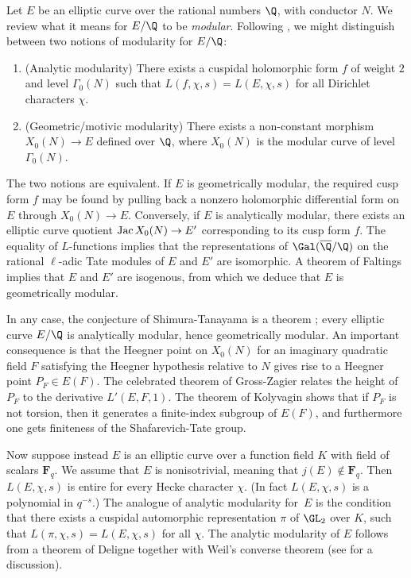\documentclass{article}
\def\F{\mathbf{F}}
\DeclareMathOperator{\Jac}{{\rm Jac}}
\begin{document}
Let $E$ be an elliptic curve over the rational numbers $\Q$, with conductor $N$.  We review what it means for $E/\Q$ to be {\em modular}.  Following \cite{UlmerAnalogies}, we might distinguish between two notions of modularity for $E/\Q$:
\begin{enumerate}
\item (Analytic modularity) There exists a cuspidal holomorphic form $f$ of weight $2$ and level $\Gamma_0(N)$ such that $L(f, \chi,s)=L(E,\chi,s)$ for all Dirichlet characters $\chi$.
\item (Geometric/motivic modularity) There exists a non-constant morphism $X_0(N)\to E$ defined over $\Q$, where $X_0(N)$ is the modular curve of level $\Gamma_0(N)$.
\end{enumerate}
The two notions are equivalent.  If $E$ is geometrically modular, the required cusp form $f$ may be found by pulling back a nonzero holomorphic differential form on $E$ through $X_0(N)\to E$.  Conversely, if $E$ is analytically modular, there exists an elliptic curve quotient $\Jac X_0(N)\to E'$ corresponding to its cusp form $f$.  The equality of $L$-functions implies that the representations of $\Gal(\overline{\Q}/\Q)$ on the rational $\ell$-adic Tate modules of $E$ and $E'$ are isomorphic.  A theorem of Faltings \cite{FaltingsMordell} implies that $E$ and $E'$ are isogenous, from which we deduce that $E$ is geometrically modular.

In any case, the conjecture of Shimura-Tanayama is a theorem \cite{BCDT};  every elliptic curve $E/\Q$ is analytically modular, hence geometrically modular.  An important consequence is that the Heegner point on $X_0(N)$ for an imaginary quadratic field $F$ satisfying the Heegner hypothesis relative to $N$ gives rise to a Heegner point $P_F\in E(F)$.  The celebrated theorem of Gross-Zagier \cite{GrossZagier} relates the height of $P_F$ to the derivative $L'(E,F,1)$.  The theorem of Kolyvagin \cite{Kolyvagin} shows that if $P_F$ is not torsion, then it generates a finite-index subgroup of $E(F)$, and furthermore one gets finiteness of the Shafarevich-Tate group.  

Now suppose instead $E$ is an elliptic curve over a function field $K$ with field of scalars $\F_q$.   We assume that $E$ is nonisotrivial, meaning that $j(E)\not\in\F_q$.   Then $L(E,\chi,s)$ is entire for every Hecke character $\chi$.  (In fact $L(E,\chi,s)$ is a polynomial in $q^{-s}$.)  The analogue of analytic modularity for~$E$ is the condition that there exists a cuspidal automorphic representation $\pi$ of $\GL_2$ over $K$, such that $L(\pi,\chi,s)=L(E,\chi,s)$ for all $\chi$.  The analytic modularity of $E$ follows from a theorem of Deligne together with Weil's converse theorem (see \cite{UlmerAnalogies} for a discussion).
\end{document}
